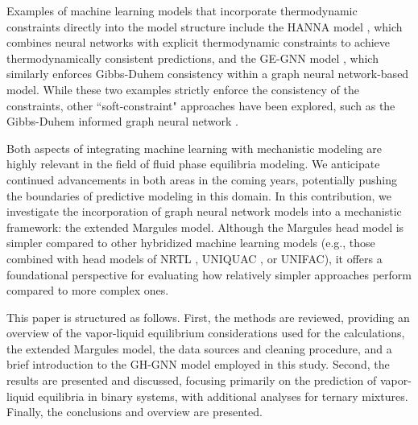 Examples of machine learning models that incorporate thermodynamic constraints directly into the model structure include the HANNA model \cite{specht2024hanna}, which combines neural networks with explicit thermodynamic constraints to achieve thermodynamically consistent predictions, and the GE-GNN model \cite{rittig2024thermodynamics}, which similarly enforces Gibbs-Duhem consistency within a graph neural network-based model. While these two examples strictly enforce the consistency of the constraints, other ``soft-constraint" approaches have been explored, such as the Gibbs-Duhem informed graph neural network \cite{rittig2023gibbs}.

Both aspects of integrating machine learning with mechanistic modeling are highly relevant in the field of fluid phase equilibria modeling. We anticipate continued advancements in both areas in the coming years, potentially pushing the boundaries of predictive modeling in this domain. In this contribution, we investigate the incorporation of graph neural network models into a mechanistic framework: the extended Margules model. Although the Margules head model is simpler compared to other hybridized machine learning models (e.g., those combined with head models of NRTL \cite{winter2023spt}, UNIQUAC \cite{jirasek2022making}, or UNIFAC\cite{hayer2025advancing}), it offers a foundational perspective for evaluating how relatively simpler approaches perform compared to more complex ones.

This paper is structured as follows. First, the methods are reviewed, providing an overview of the vapor-liquid equilibrium considerations used for the calculations, the extended Margules model, the data sources and cleaning procedure, and a brief introduction to the GH-GNN model employed in this study. Second, the results are presented and discussed, focusing primarily on the prediction of vapor-liquid equilibria in binary systems, with additional analyses for ternary mixtures. Finally, the conclusions and overview are presented.
